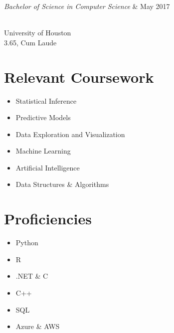 \documentclass{res}
\begin{document}
{\begin{resume}
\begin{ncolumn}{2}
  {\it Bachelor of Science in Computer Science}  &   {\hspace*{\fill} May 2017}
\end{ncolumn}\\
University of Houston\\
3.65, Cum Laude

\begin{multicols}{2}
  \section{\bf Relevant Coursework}
  \begin{itemize}[noitemsep]
    \item Statistical Inference
    \item Predictive Models
    \item Data Exploration and Visualization
    \item Machine Learning
    \item Artificial Intelligence
    \item Data Structures \& Algorithms
  \end{itemize}

  \section{\bf Proficiencies}
  \begin{itemize}[noitemsep]
    \item Python
    \item R
    \item .NET \& C\musSharp{}
    \item C++
    \item SQL
    \item Azure \& AWS
  \end{itemize}
\end{multicols}

\end{resume}

\vfill}
\end{document}
